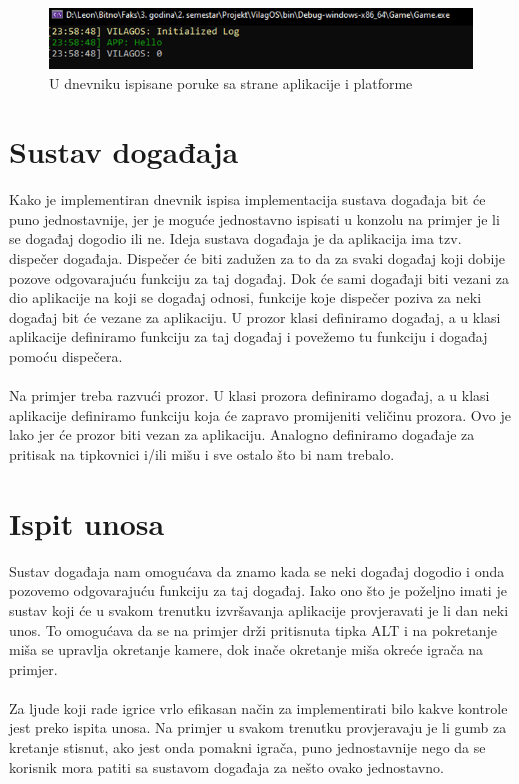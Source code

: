 \documentclass{mathos}
\begin{document}
\begin{figure}[H]
    \centering
    \includegraphics[scale=0.5]{Slike/Dnevnik.png}
    \caption{U dnevniku ispisane poruke sa strane aplikacije i platforme}
    \label{im_Dnevnik}
\end{figure}

\section{Sustav događaja}\label{ss_događaji}
Kako je implementiran dnevnik ispisa implementacija sustava događaja bit će puno jednostavnije, jer je moguće jednostavno ispisati u konzolu na primjer je li se događaj dogodio
ili ne. Ideja sustava događaja je da aplikacija ima tzv. dispečer događaja. Dispečer će biti zadužen za to da za svaki događaj koji dobije pozove odgovarajuću funkciju za taj
događaj. Dok će sami događaji biti vezani za dio aplikacije na koji se događaj odnosi, funkcije koje dispečer poziva za neki događaj bit će vezane za aplikaciju. U prozor klasi
definiramo događaj, a u klasi aplikacije definiramo funkciju za taj događaj i povežemo tu funkciju i događaj pomoću dispečera.
\\ \\
Na primjer treba razvući prozor. U klasi prozora definiramo događaj, a u klasi aplikacije definiramo funkciju koja će zapravo promijeniti veličinu prozora. Ovo je lako jer
će prozor biti vezan za aplikaciju. Analogno definiramo događaje za pritisak na tipkovnici i/ili mišu i sve ostalo što bi nam trebalo.

\section{Ispit unosa}\label{ss_unos}
Sustav događaja nam omogućava da znamo kada se neki događaj dogodio i onda pozovemo odgovarajuću funkciju za taj događaj. Iako ono što je poželjno imati je sustav koji će u
svakom trenutku izvršavanja aplikacije provjeravati je li dan neki unos. To omogućava da se na primjer drži pritisnuta tipka ALT i na pokretanje miša se upravlja okretanje
kamere, dok inače okretanje miša okreće igrača na primjer.
\\ \\
Za ljude koji rade igrice vrlo efikasan način za implementirati bilo kakve kontrole jest preko ispita unosa. Na primjer u svakom trenutku provjeravaju
je li gumb za kretanje stisnut, ako jest onda pomakni igrača, puno jednostavnije nego da se korisnik mora patiti sa sustavom događaja za nešto ovako jednostavno.
\end{document}
